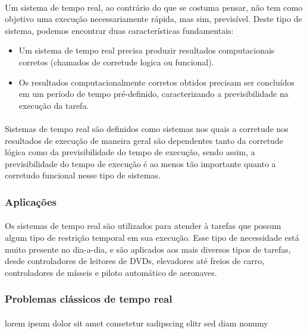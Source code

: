 \paragraph{}
Um sistema de tempo real, ao contrário do que se costuma pensar, não tem
como objetivo uma execução necessariamente rápida, mas sim, previsível.
Deste tipo de sistema, podemos encontrar duas características fundamentais:

\begin{itemize}
\item Um sistema de tempo real precisa produzir resultados computacionais corretos
(chamados de corretude logica ou funcional).
\item Os resultados computacionalmente corretos obtidos precisam ser concluídos em
um período de tempo pré-definido, caracterizando a previsibilidade na execução da tarefa.
\end{itemize}

\paragraph{}
Sistemas de tempo real são definidos como sistemas nos quais a corretude nos
resultados de execução de maneira geral são dependentes tanto da corretude
lógica como da previsibilidade do tempo de execução, sendo assim, a previsibilidade
do tempo de execução é ao menos tão importante quanto a corretudo funcional
nesse tipo de sistemas.~\cite{Li:2003:RCE:829584}

\subsubsection{Aplicações}
\paragraph{}
Os sistemas de tempo real são utilizados para atender à tarefas que possum algum tipo
de restrição temporal em sua execução. Esse tipo de necessidade está muito presente no
dia-a-dia, e são aplicados aos mais diversos tipos de tarefas, desde controladores de
leitores de DVDs, elevadores até freios de carro, controladores de mísseis e piloto automático
de aeronaves.

\subsubsection{Problemas clássicos de tempo real}
\paragraph{}
lorem ipsum dolor sit amet consetetur sadipscing elitr sed diam nonumy


